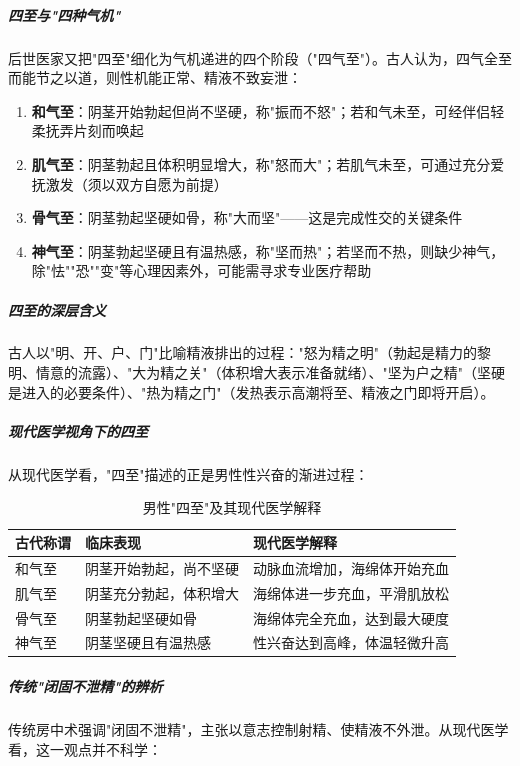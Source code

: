 \documentclass[12pt,a4paper,twoside]{ctexbook}
\begin{document}
\subparagraph{四至与"四种气机"}

后世医家又把"四至"细化为气机递进的四个阶段（"四气至"）。古人认为，四气全至而能节之以道，则性机能正常、精液不致妄泄：

\begin{enumerate}
	\item \textbf{和气至}：阴茎开始勃起但尚不坚硬，称"振而不怒"；若和气未至，可经伴侣轻柔抚弄片刻而唤起
	\item \textbf{肌气至}：阴茎勃起且体积明显增大，称"怒而大"；若肌气未至，可通过充分爱抚激发（须以双方自愿为前提）
	\item \textbf{骨气至}：阴茎勃起坚硬如骨，称"大而坚"——这是完成性交的关键条件
	\item \textbf{神气至}：阴茎勃起坚硬且有温热感，称"坚而热"；若坚而不热，则缺少神气，除"怯""恐""变"等心理因素外，可能需寻求专业医疗帮助
\end{enumerate}

\subparagraph{四至的深层含义}

古人以"明、开、户、门"比喻精液排出的过程："怒为精之明"（勃起是精力的黎明、情意的流露）、"大为精之关"（体积增大表示准备就绪）、"坚为户之精"（坚硬是进入的必要条件）、"热为精之门"（发热表示高潮将至、精液之门即将开启）。

\subparagraph{现代医学视角下的四至}

从现代医学看，"四至"描述的正是男性性兴奋的渐进过程：

\begin{table}[htbp]
\centering
\caption{男性"四至"及其现代医学解释}
\label{tab:male_sizhi}
\begin{tabularx}{\textwidth}{@{}p{2.2cm} p{5cm} X@{}}
    \toprule
    \textbf{古代称谓} & \textbf{临床表现} & \textbf{现代医学解释} \\
    \midrule
    和气至 & 阴茎开始勃起，尚不坚硬 & 动脉血流增加，海绵体开始充血 \\
    肌气至 & 阴茎充分勃起，体积增大 & 海绵体进一步充血，平滑肌放松 \\
    骨气至 & 阴茎勃起坚硬如骨 & 海绵体完全充血，达到最大硬度 \\
    神气至 & 阴茎坚硬且有温热感 & 性兴奋达到高峰，体温轻微升高 \\
    \bottomrule
\end{tabularx}
\end{table}

\subparagraph{传统"闭固不泄精"的辨析}

传统房中术强调"闭固不泄精"，主张以意志控制射精、使精液不外泄。从现代医学看，这一观点并不科学：
\end{document}
